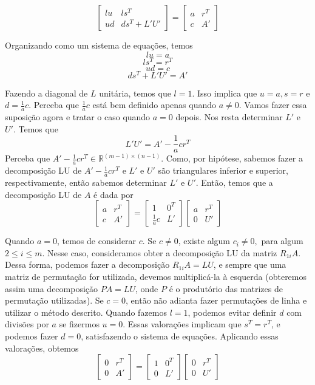 \documentclass[]{article}
\numberwithin{equation}{section}
\begin{document}
$$
\begin{bmatrix}
lu & ls^T \\
ud & ds^T + L'U'
\end{bmatrix}
=
\begin{bmatrix}
a & r^T \\
c & A'
\end{bmatrix}
$$

Organizando como um sistema de equações, temos
$$
lu = a
$$
$$
ls^T = r^T
$$
$$
ud = c
$$
$$
ds^T + L'U' = A'
$$

Fazendo a diagonal de $L$ unitária, temos que $l = 1$. Isso implica que $u = a, s = r$ e $d = \frac{1}{a} c$. Perceba que $\frac{1}{a} c$ está bem definido apenas quando $a \neq 0$. Vamos fazer essa suposição agora e tratar o caso quando $a = 0$ depois. Nos resta determinar $L'$ e $U'$. Temos que
$$
L'U' = A' - \frac{1}{a} cr^T
$$
Perceba que $A' - \frac{1}{a} cr^T \in \mathbb{R}^{(m - 1) \times (n - 1)}$. Como, por hipótese, sabemos fazer a decomposição LU de $A' - \frac{1}{a} cr^T$ e $L'$ e $U'$ são triangulares inferior e superior, respectivamente, então sabemos determinar $L'$ e $U'$. Então, temos que a decomposição LU de $A$ é dada por
$$
\begin{bmatrix}
a & r^T \\
c & A'
\end{bmatrix}
=
\begin{bmatrix}
1 & 0^T \\
\frac{1}{a} c & L'
\end{bmatrix}
\begin{bmatrix}
a & r^T \\
0 & U'
\end{bmatrix}
$$

Quando $a = 0$, temos de considerar $c$. Se $c \neq 0$, existe algum $c_i \neq 0,$ para algum $2 \leq i \leq m$. Nesse caso, consideramos obter a decomposição LU da matriz $R_{1i}A$. Dessa forma, podemos fazer a decomposição $R_{1i}A = LU$, e sempre que uma matriz de permutação for utilizada, devemos multiplicá-la à esquerda (obteremos assim uma decomposição $PA = LU$, onde $P$ é o produtório das matrizes de permutação utilizadas). Se $c = 0$, então não adianta fazer permutações de linha e utilizar o método descrito. Quando fazemos $l = 1$, podemos evitar definir $d$ com divisões por $a$ se fizermos $u = 0$. Essas valorações implicam que $s^T = r^T$, e podemos fazer $d = 0$, satisfazendo o sistema de equações. Aplicando essas valorações, obtemos
$$
\begin{bmatrix}
0 & r^T \\
0 & A'
\end{bmatrix}
=
\begin{bmatrix}
1 & 0^T \\
0 & L'
\end{bmatrix}
\begin{bmatrix}
0 & r^T \\
0 & U'
\end{bmatrix}
$$
\end{document}
